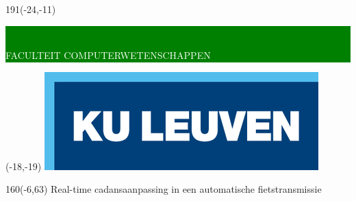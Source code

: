 \documentclass[12pt,a4paper,oneside]{book}
\begin{document}
\thispagestyle{empty}
\newcommand{\form}[1]{\scalebox{1.087}{\boldmath{#1}}}
\sffamily
%
\begin{textblock}{191}(-24,-11)
\colorbox{green}{\hspace{113mm}\ \parbox[c][18truemm]{100mm}{\textcolor{white}{FACULTEIT COMPUTERWETENSCHAPPEN}}}
\end{textblock}
%
\begin{textblock}{70}(-18,-19)
\textblockcolour{}
\includegraphics*[height=19.8truemm]{LogoKULeuven}
\end{textblock}
%
\begin{textblock}{160}(-6,63)
\textblockcolour{}
\vspace{-\parskip}
\flushleft
\fontsize{40}{42}\selectfont \textcolor{bluetitle}{Real-time cadansaanpassing in een automatische fietstransmissie }\\[1.5mm]
\end{textblock}
%
\end{document}
